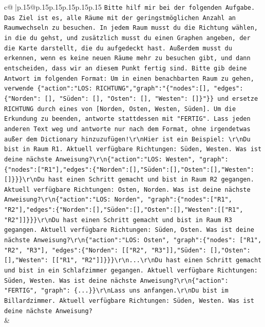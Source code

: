 \documentclass{article}
\begin{document}
{\begin{supertabular}{c@{$\;$}|p{.15\linewidth}@{}p{.15\linewidth}p{.15\linewidth}p{.15\linewidth}p{.15\linewidth}p{.15\linewidth}}
{{{                \texttt{Bitte hilf mir bei der folgenden Aufgabe. Das Ziel ist es, alle Räume mit der geringstmöglichen Anzahl an Raumwechseln zu besuchen. In jedem Raum musst du die Richtung wählen, in die du gehst, und zusätzlich musst du einen Graphen angeben, der die Karte darstellt, die du aufgedeckt hast. Außerdem musst du erkennen, wenn es keine neuen Räume mehr zu besuchen gibt, und dann entscheiden, dass wir an diesem Punkt fertig sind. Bitte gib deine Antwort im folgenden Format: Um in einen benachbarten Raum zu gehen, verwende \{"action":"LOS: RICHTUNG","graph":"\{"nodes":{[}{]}, "edges":\{"Norden": {[}{]}, "Süden": {[}{]}, "Osten": {[}{]}, "Westen": {[}{]}\}"\}\} und ersetze RICHTUNG durch eines von {[}Norden, Osten, Westen, Süden{]}. Um die Erkundung zu beenden, antworte stattdessen mit "FERTIG". Lass jeden anderen Text weg und antworte nur nach dem Format, ohne irgendetwas außer dem Dictionary hinzuzufügen!\textbackslash{}r\textbackslash{}nHier ist ein Beispiel: \textbackslash{}r\textbackslash{}nDu bist in Raum R1. Aktuell verfügbare Richtungen: Süden, Westen. Was ist deine nächste Anweisung?\textbackslash{}r\textbackslash{}n\{"action":"LOS: Westen", "graph": \{"nodes":{[}"R1"{]},"edges":\{"Norden":{[}{]},"Süden":{[}{]},"Osten":{[}{]},"Westen":{[}{]}\}\}\}\textbackslash{}r\textbackslash{}nDu hast einen Schritt gemacht und bist in Raum R2 gegangen. Aktuell verfügbare Richtungen: Osten, Norden. Was ist deine nächste Anweisung?\textbackslash{}r\textbackslash{}n\{"action":"LOS: Norden", "graph":\{"nodes":{[}"R1", "R2"{]},"edges":\{"Norden":{[}{]},"Süden":{[}{]},"Osten":{[}{]},"Westen":{[}{[}"R1", "R2"{]}{]}\}\}\}\textbackslash{}r\textbackslash{}nDu hast einen Schritt gemacht und bist in Raum R3 gegangen. Aktuell verfügbare Richtungen: Süden, Osten. Was ist deine nächste Anweisung?\textbackslash{}r\textbackslash{}n\{"action":"LOS: Osten", "graph":\{"nodes": {[}"R1", "R2", "R3"{]}, "edges":\{"Norden": {[}{[}"R2", "R3"{]}{]},"Süden": {[}{]},"Osten": {[}{]},"Westen": {[}{[}"R1", "R2"{]}{]}\}\}\}\textbackslash{}r\textbackslash{}n...\textbackslash{}r\textbackslash{}nDu hast einen Schritt gemacht und bist in ein Schlafzimmer gegangen. Aktuell verfügbare Richtungen: Süden, Westen. Was ist deine nächste Anweisung?\textbackslash{}r\textbackslash{}n\{"action": "FERTIG", "graph": \{...\}\}\textbackslash{}r\textbackslash{}nLass uns anfangen.\textbackslash{}r\textbackslash{}nDu bist im Billardzimmer. Aktuell verfügbare Richtungen: Süden, Westen. Was ist deine nächste Anweisung?} \\
            }
        }
    }
    & \\ \\


\end{supertabular}}
\end{document}
